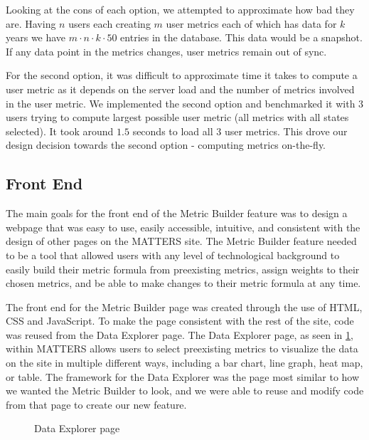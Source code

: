 			Looking at the cons of each option, we attempted to approximate how bad they are.
			Having $n$ users each creating $m$ user metrics each of which has data for $k$ years
			we have $m \cdot n \cdot k \cdot 50$ entries in the database.
			This data would be a snapshot. If any data point in the metrics changes, user metrics remain out of sync.

			For the second option, it was difficult to approximate time it takes to compute a user metric 
			as it depends on the server load and the number of metrics involved in the user metric. 
			We implemented the second option and benchmarked it with $3$ users trying to compute 
			largest possible user metric (all metrics with all states selected). 
			It took around $1.5$ seconds to load all $3$ user metrics. 
			This drove our design decision towards the second option - computing metrics on-the-fly.

		\subsection{Front End}
		
			The main goals for the front end of the Metric Builder feature was to design a webpage 
			that was easy to use, easily accessible, intuitive, and consistent 
			with the design of other pages on the MATTERS site. 
			The Metric Builder feature needed to be a tool that allowed users with any level of 
			technological background to easily build their metric formula from preexisting metrics, 
			assign weights to their chosen metrics, and be able to make changes to their metric formula at any time.
			
			The front end for the Metric Builder page was created through the use of HTML, CSS and JavaScript. 
			To make the page consistent with the rest of the site, code was reused from the Data Explorer page. 
			The Data Explorer page, as seen in \ref{fig:dataexplorer}, within MATTERS allows users to select 
			preexisting metrics to visualize the data on the site in multiple different ways, 
			including a bar chart, line graph, heat map, or table. The framework for the 
			Data Explorer was the page most similar to how we wanted the Metric Builder to look, 
			and we were able to reuse and modify code from that page to create our new feature. 
			
			\begin{figure}[t]
				\centering
					\caption{Data Explorer page}
				\label{fig:dataexplorer}
			\end{figure}
			
